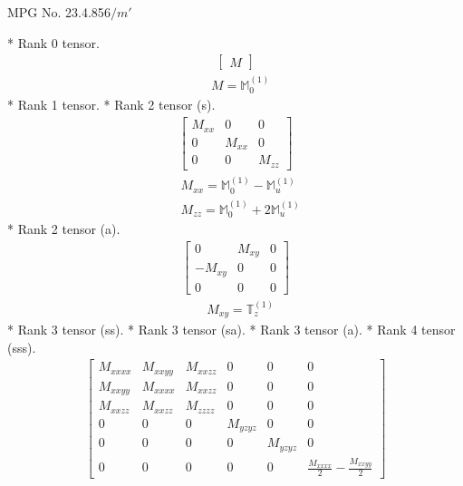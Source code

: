 \documentclass[fleqn,8pt,landscape]{jsarticle}
\begin{document}
\setcounter{MaxMatrixCols}{32}

\renewcommand{\tablename}{Table~}
\renewcommand{\figurename}{Figure~}
\begin{center}
\LARGE
MPG No. 23.4.85\quad$6/m'$
\end{center}
* Rank 0 tensor.
\begin{align*}
\begin{bmatrix} M \end{bmatrix}
\end{align*}
\begin{align*}
& M = \mathbb{M}_{0}^{(1)}
\end{align*}
* Rank 1 tensor.
* Rank 2 tensor (s).
\begin{align*}
\begin{bmatrix} M_{xx} & 0 & 0 \\ 0 & M_{xx} & 0 \\ 0 & 0 & M_{zz} \end{bmatrix}
\end{align*}
\begin{align*}
& M_{xx} = \mathbb{M}_{0}^{(1)} - \mathbb{M}_{u}^{(1)} \\
& M_{zz} = \mathbb{M}_{0}^{(1)} + 2 \mathbb{M}_{u}^{(1)}
\end{align*}
* Rank 2 tensor (a).
\begin{align*}
\begin{bmatrix} 0 & M_{xy} & 0 \\ - M_{xy} & 0 & 0 \\ 0 & 0 & 0 \end{bmatrix}
\end{align*}
\begin{align*}
& M_{xy} = \mathbb{T}_{z}^{(1)}
\end{align*}
* Rank 3 tensor (ss).
* Rank 3 tensor (sa).
* Rank 3 tensor (a).
* Rank 4 tensor (sss).
\begin{align*}
\begin{bmatrix} M_{xxxx} & M_{xxyy} & M_{xxzz} & 0 & 0 & 0 \\ M_{xxyy} & M_{xxxx} & M_{xxzz} & 0 & 0 & 0 \\ M_{xxzz} & M_{xxzz} & M_{zzzz} & 0 & 0 & 0 \\ 0 & 0 & 0 & M_{yzyz} & 0 & 0 \\ 0 & 0 & 0 & 0 & M_{yzyz} & 0 \\ 0 & 0 & 0 & 0 & 0 & \frac{M_{xxxx}}{2} - \frac{M_{xxyy}}{2} \end{bmatrix}
\end{align*}
\end{document}

